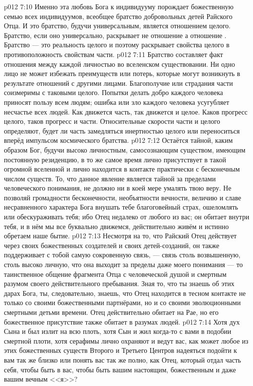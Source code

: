 \vs p012 7:10 Именно эта любовь Бога к индивидууму порождает божественную семью всех индивидуумов, всеобщее братство добровольных детей Райского Отца. И это братство, будучи универсальным, является отношением целого. Братство, если оно универсально, раскрывает не отношение  а отношение . Братство --- это реальность целого и поэтому раскрывает свойства целого в противоположность свойствам части.
\vs p012 7:11 Братство составляет факт отношения между каждой личностью во вселенском существовании. Ни одно лицо не может избежать преимуществ или потерь, которые могут возникнуть в результате отношений с другими лицами. Благополучие или страдания части соизмеримы с таковыми целого. Попытки делать добро каждого человека приносят пользу всем людям; ошибка или зло каждого человека усугубляет несчастье всех людей. Как движется часть, так движется и целое. Каков прогресс целого, таков прогресс и части. Относительные скорости части и целого определяют, будет ли часть замедляться инертностью целого или переноситься вперёд импульсом космического братства.
\vs p012 7:12 \pc Остаётся тайной, каким образом Бог, будучи высоко личностным, самосознающим существом, имеющим постоянную резиденцию, в то же самое время лично присутствует в такой огромной вселенной и лично находится в контакте практически с бесконечным числом существ. То, что данное явление является тайной за пределами человеческого понимания, не должно ни в коей мере умалять твою веру. Не позволяй громадности бесконечности, необъятности вечности, величию и славе несравненного характера Бога внушать тебе благоговейный страх, ошеломлять или обескураживать тебя; ибо Отец недалеко от любого из вас; он обитает внутри тебя, и в нём мы все буквально движемся, действительно живём и истинно обретаем наше бытие.
\vs p012 7:13 \pc Несмотря на то, что Райский Отец действует через своих божественных создателей и своих детей\hyp{}созданий, он также поддерживает с тобой самую сокровенную связь, --- связь столь возвышенную, столь высоко личную, что она выходит за пределы даже моего понимания --- то таинственное общение фрагмента Отца с человеческой душой и смертным разумом своего действительного пребывания. Зная то, что ты знаешь об этих дарах Бога, ты, следовательно, знаешь, что Отец находится в тесном контакте не только со своими божественными партнёрами, но и со своими эволюционными смертными детьми времени. Отец действительно обитает на Рае, но его божественное присутствие также обитает в разумах людей.
\vs p012 7:14 Хотя дух Сына и был излит на всю плоть, хотя Сын и жил когда\hyp{}то с вами в подобии смертной плоти, хотя серафимы лично охраняют и ведут вас, как может любое из этих божественных существ Второго и Третьего Центров надеяться подойти к вам так же близко или понять вас так же полно, как Отец, который отдал часть себя, чтобы быть в вас, чтобы быть вашим настоящим, божественным и даже вашим вечным <<я>>?
